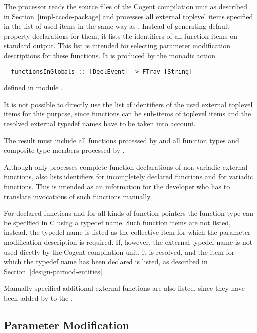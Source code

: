 The processor reads the source files of the Cogent compilation unit as described in Section~\ref{impl-ccode-package}
and processes all external toplevel items specified in the list of used items in the same way as .
Instead of generating default property declarations for them, it lists the identifiers of all function items on 
standard output. This list is intended for selecting parameter modification descriptions for these functions. It
is produced by the monadic action
\begin{verbatim}
  functionsInGlobals :: [DeclEvent] -> FTrav [String]
\end{verbatim}
defined in module .

It is not possible to directly use the list of identifiers of the used external toplevel items for this purpose, since 
functions can be sub-items of toplevel items and the resolved external typedef names have to be taken into account.

The result must include all functions processed by  and all function types and composite type members
processed by . 

Although  only processes complete function declarations of non-variadic external functions, 
 also lists identifiers for incompletely declared functions and for variadic functions.
This is intended as an information for the developer who has to translate invocations of such functions manually.

For declared functions and for all kinds of function pointers the function type can be specified in C using a typedef name.
Such function items are not listed, instead, the typedef name is listed as the collective item for which the parameter
modification description is required. If, however, the external typedef name is not used diectly by the Cogent compilation
unit, it is resolved, and the item for which the typedef name has been declared is listed, as described in 
Section~\ref{design-parmod-entities}.

Manually specified additional external functions are also listed, since they have been added by 
to the .

\subsection{Parameter Modification}
\label{impl-ccomps-parmod}

